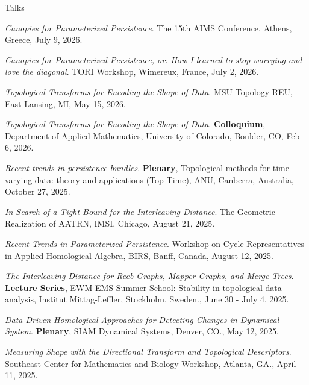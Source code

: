 \documentclass{resume} %
\begin{document}
\begin{rSection}{Talks}
\begin{etaremune}
\item\emph{Canopies for Parameterized Persistence}. The 15th AIMS Conference, Athens, Greece, July 9, 2026. 

\item\emph{Canopies for Parameterized Persistence, or: How I learned to stop worrying and love the diagonal}. TORI Workshop, Wimereux, France, July 2, 2026. 

\item\emph{Topological Transforms for Encoding the Shape of Data}. MSU Topology REU, East Lansing, MI, May 15, 2026. 

\item\emph{Topological Transforms for Encoding the Shape of Data}. \textbf{Colloquium}, Department of Applied Mathematics, University of Colorado, Boulder, CO, Feb 6, 2026. 

\item\emph{Recent trends in persistence bundles}. \textbf{Plenary}, \href{https://maths.anu.edu.au/news-events/events/topological-methods-time-varying-data-theory-and-applications-top-time}{Topological methods for time-varying data: theory and applications (Top Time)}, ANU, Canberra, Australia, October 27, 2025. 

\item\emph{\href{https://www.youtube.com/watch?v=nw3OCO87l5I}{In Search of a Tight Bound for the Interleaving Distance}}. The Geometric Realization of AATRN, IMSI, Chicago, August 21, 2025. 

\item\emph{\href{https://www.birs.ca/events/2025/5-day-workshops/25w5481/videos/watch/202508121404-Munch.html}{Recent Trends in Parameterized Persistence}}. Workshop on Cycle Representatives in Applied Homological Algebra, BIRS, Banff, Canada, August 12, 2025. 

\item\emph{\href{https://www.mittag-leffler.se/activities/ewm-ems-summer-school-stability-in-topological-data-analysis/}{The Interleaving Distance for Reeb Graphs, Mapper Graphs, and Merge Trees}}. \textbf{Lecture Series}, EWM-EMS Summer School: Stability in topological data analysis, Institut Mittag-Leffler, Stockholm, Sweden., June 30 - July 4, 2025. 

\item\emph{Data Driven Homological Approaches for Detecting Changes in Dynamical System}. \textbf{Plenary}, SIAM Dynamical Systems, Denver, CO., May 12, 2025. 

\item\emph{Measuring Shape with the Directional Transform and Topological Descriptors}. Southeast Center for Mathematics and Biology Workshop, Atlanta, GA., April 11, 2025. 


\end{etaremune}
\end{rSection}
\end{document}
